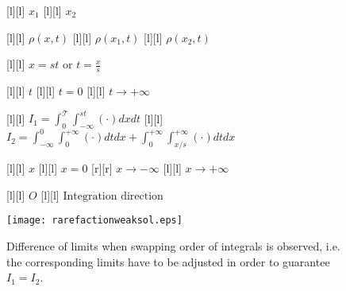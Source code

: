\begin{figure}[ht]
	\centering
	\footnotesize


	[l] {$x_1$}
	[l] {$x_2$}

	[l] {$\rho(x,t)$}
	[l] {$\rho(x_{1},t)$}
	[l] {$\rho(x_{2},t)$}

	[l] {$\displaystyle x=st\text{ or }t=\frac{x}{s}$}

	[l] {$t$}
	[l] {$t = 0$}
	[l] {$t \rightarrow +\infty$}


	[l] {$\displaystyle I_{1} = \int_{0}^{\mathscr{T}}\int_{-\infty}^{st} \left(\cdot\right)dxdt$}
	[l] {$\displaystyle I_{2}
			=
			\int_{-\infty}^{0}\int_{0}^{+\infty} \left(\cdot\right)dtdx
			+
			\int_{0}^{+\infty}\int_{x/s}^{+\infty} \left(\cdot\right)dtdx
		$}

	[l] {$x$}
	[l] {$x=0$}
	[r] {$x\rightarrow -\infty$}
	[l] {$x\rightarrow +\infty$}

	[l] {$O$}
	[l] {$\text{Integration direction}$}

	\texttt{[image: rarefactionweaksol.eps]}
	\caption{Difference of limits when swapping order of integrals is observed, i.e. the corresponding limits
		have to be adjusted in order to guarantee $I_{1} = I_{2}$.}
	\label{\LABEL}
\end{figure}
